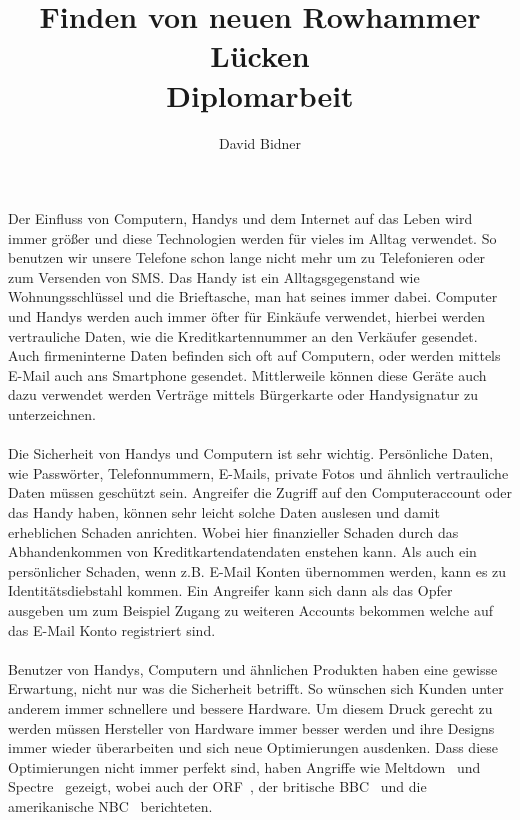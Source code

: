 \documentclass[a4paper]{article}
\title{Finden von neuen Rowhammer Lücken \\ \vspace{+2ex}\small{Diplomarbeit}}
\author{David Bidner}
\date{\vspace{-5ex}}
\begin{document}
\maketitle

Der Einfluss von Computern, Handys und dem Internet auf das Leben wird immer
größer und diese Technologien werden für vieles im Alltag verwendet. So benutzen
wir unsere Telefone schon lange nicht mehr um zu Telefonieren oder zum Versenden
von SMS. Das Handy ist ein Alltagsgegenstand wie Wohnungsschlüssel und die
Brieftasche, man hat seines immer dabei. Computer und Handys werden auch immer
öfter für Einkäufe verwendet, hierbei werden vertrauliche Daten, wie die
Kreditkartennummer an den Verkäufer gesendet. Auch firmeninterne Daten befinden
sich oft auf Computern, oder werden mittels E-Mail auch ans Smartphone gesendet.
Mittlerweile können diese Geräte auch dazu verwendet werden Verträge mittels
Bürgerkarte oder Handysignatur zu unterzeichnen.

\paragraph{}

Die Sicherheit von Handys und Computern ist sehr wichtig. Persönliche
Daten, wie Passwörter, Telefonnummern, E-Mails, private Fotos und ähnlich
vertrauliche Daten müssen geschützt sein. Angreifer die Zugriff auf den
Computeraccount oder das Handy haben, können sehr leicht solche Daten auslesen
und damit erheblichen Schaden anrichten. Wobei hier finanzieller Schaden durch
das Abhandenkommen von Kreditkartendatendaten enstehen kann. Als auch ein
persönlicher Schaden, wenn z.B. E-Mail Konten übernommen werden, kann es zu
Identitätsdiebstahl kommen. Ein Angreifer kann sich dann als das Opfer ausgeben
um zum Beispiel Zugang zu weiteren Accounts bekommen welche auf das E-Mail Konto
registriert sind.

\paragraph{}



Benutzer von Handys, Computern und ähnlichen Produkten haben eine gewisse
Erwartung, nicht nur was die Sicherheit betrifft. So wünschen sich Kunden unter
anderem immer schnellere und bessere Hardware. Um diesem Druck gerecht zu werden
müssen Hersteller von Hardware immer besser werden und ihre Designs immer wieder
überarbeiten und sich neue Optimierungen ausdenken. Dass diese Optimierungen
nicht immer perfekt sind, haben Angriffe wie Meltdown~\cite{meltdown}
und Spectre~\cite{spectre} gezeigt, wobei auch der ORF~\cite{orfmeltdown}, der
britische BBC~\cite{bbcmeltdown} und die amerikanische NBC~\cite{nbcmeltdown}
berichteten.
\end{document}
